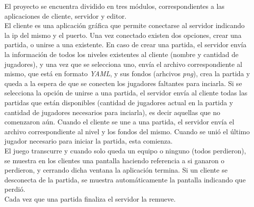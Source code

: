 El proyecto se encuentra dividido en tres módulos, correspondientes a las aplicaciones de cliente, servidor y editor.\\
\indent El cliente es una aplicación gráfica que permite conectarse al servidor indicando la ip del mismo y el puerto. Una vez conectado existen dos opciones, crear una partida, o unirse a una existente. En caso de crear una partida, el servidor envía la información de todos los niveles existentes al cliente (nombre y cantidad de jugadores), y una vez que se selecciona uno, envía el archivo correspondiente al mismo, que está en formato \textit{YAML}, y sus fondos (arhcivos \textit{png}), crea la partida y queda a la espera de que se conecten los jugadores faltantes para inciarla. Si se selecciona la opción de unirse a una partida, el servidor envía al cliente todas las partidas que están disponibles (cantidad de jugadores actual en la partida y cantidad de jugadores necesarios para inciarla), es decir aquellas que no comenzaron aún. Cuando el cliente se une a una partida, el servidor envía el archivo correspondiente al nivel y los fondos del mismo. Cuando se unió el último jugador necesario para iniciar la partida, esta comienza.\\
\indent El juego transcurre y cuando solo queda un equipo o ninguno (todos perdieron), se muestra en los clientes una pantalla haciendo referencia a si ganaron o perdieron, y cerrando dicha ventana la aplicación termina. Si un cliente se desconecta de la partida, se muestra automáticamente la pantalla indicando que perdió.\\
\indent Cada vez que una partida finaliza el servidor la remueve.




